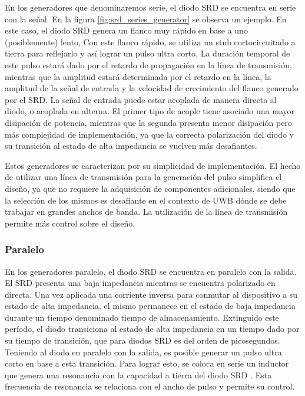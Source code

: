 En los generadores que denominaremos serie, el diodo SRD se encuentra en serie
con la señal. En la figura \ref{fig:srd_series_generator} se observa un ejemplo.
En este caso, el diodo SRD genera un flanco muy rápido en base a uno
(posiblemente) lento, Con este flanco rápido, se utiliza un stub cortocircuitado
a tierra para reflejarlo y así lograr un pulso ultra corto. La duración temporal
de este pulso estará dado por el retardo de propagación en la línea de
transmisión, mientras que la amplitud estará determinada por el retardo en la
línea, la amplitud de la señal de entrada y la velocidad de crecimiento del
flanco generado por el SRD. La señal de entrada puede estar acoplada de manera
directa al diodo, o acoplada en alterna. El primer tipo de acople tiene asociado
una mayor disipación de potencia, mientras que la segunda presenta menor
disipación pero más complejidad de implementación, ya que la correcta
polarización del diodo y su transición al estado de alta impedancia se vuelven
más desafiantes.

Estos generadores se caracterizan por su simplicidad de implementación. El hecho
de utilizar una línea de transmisión para la generación del pulso simplifica el
diseño, ya que no requiere la adquisición de componentes adicionales, siendo que
la selección de los mismos es desafiante en el contexto de UWB dónde se debe
trabajar en grandes anchos de banda. La utilización de la línea de transmisión
permite más control sobre el diseño.

\subsubsection{Paralelo}

En los generadores paralelo, el diodo SRD se encuentra en paralelo con la
salida. El SRD presenta una baja impedancia mientras se encuentra polarizado en
directa. Una vez aplicada una corriente inversa para conmutar al dispositivo a
su estado de alta impedancia, el mismo permanece en el estado de baja impedancia
durante un tiempo denominado tiempo de almacenamiento. Extinguido este período,
el diodo transiciona al estado de alta impedancia en un tiempo dado por su
tiempo de transición, que para diodos SRD es del orden de picosegundos. Teniendo
al diodo en paralelo con la salida, es posible generar un pulso ultra corto en
base a esta transición. Para lograr esto, se coloca en serie un inductor que
genera una resonancia con la capacidad a tierra del diodo SRD \cite{Hall1966}.
Esta frecuencia de resonancia se relaciona con el ancho de pulso y permite su
control.

